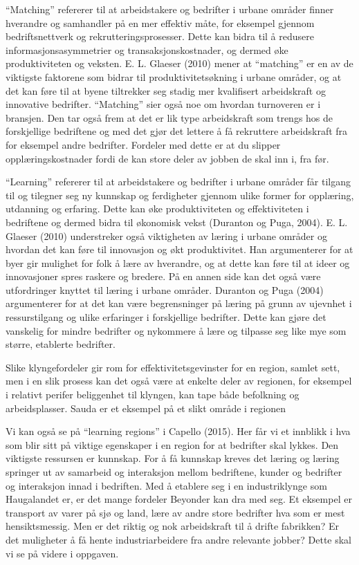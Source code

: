\documentclass[
]{article}
\begin{document}
``Matching'' refererer til at arbeidstakere og bedrifter i urbane
områder finner hverandre og samhandler på en mer effektiv måte, for
eksempel gjennom bedriftsnettverk og rekrutteringsprosesser. Dette kan
bidra til å redusere informasjonsasymmetrier og transaksjonskostnader,
og dermed øke produktiviteten og veksten. E. L. Glaeser (2010) mener at
``matching'' er en av de viktigste faktorene som bidrar til
produktivitetsøkning i urbane områder, og at det kan føre til at byene
tiltrekker seg stadig mer kvalifisert arbeidskraft og innovative
bedrifter. ``Matching'' sier også noe om hvordan turnoveren er i
bransjen. Den tar også frem at det er lik type arbeidskraft som trengs
hos de forskjellige bedriftene og med det gjør det lettere å få
rekruttere arbeidskraft fra for eksempel andre bedrifter. Fordeler med
dette er at du slipper opplæringskostnader fordi de kan store deler av
jobben de skal inn i, fra før.

``Learning'' refererer til at arbeidstakere og bedrifter i urbane
områder får tilgang til og tilegner seg ny kunnskap og ferdigheter
gjennom ulike former for opplæring, utdanning og erfaring. Dette kan øke
produktiviteten og effektiviteten i bedriftene og dermed bidra til
økonomisk vekst (Duranton og Puga, 2004). E. L. Glaeser (2010)
understreker også viktigheten av læring i urbane områder og hvordan det
kan føre til innovasjon og økt produktivitet. Han argumenterer for at
byer gir mulighet for folk å lære av hverandre, og at dette kan føre til
at ideer og innovasjoner spres raskere og bredere. På en annen side kan
det også være utfordringer knyttet til læring i urbane områder. Duranton
og Puga (2004) argumenterer for at det kan være begrensninger på læring
på grunn av ujevnhet i ressurstilgang og ulike erfaringer i forskjellige
bedrifter. Dette kan gjøre det vanskelig for mindre bedrifter og
nykommere å lære og tilpasse seg like mye som større, etablerte
bedrifter.

Slike klyngefordeler gir rom for effektivitetsgevinster for en region,
samlet sett, men i en slik prosess kan det også være at enkelte deler av
regionen, for eksempel i relativt perifer beliggenhet til klyngen, kan
tape både befolkning og arbeidsplasser. Sauda er et eksempel på et slikt
område i regionen

Vi kan også se på ``learning regions'' i Capello (2015). Her får vi et
innblikk i hva som blir sitt på viktige egenskaper i en region for at
bedrifter skal lykkes. Den viktigste ressursen er kunnskap. For å få
kunnskap kreves det læring og læring springer ut av samarbeid og
interaksjon mellom bedriftene, kunder og bedrifter og interaksjon innad
i bedriften. Med å etablere seg i en industriklynge som Haugalandet er,
er det mange fordeler Beyonder kan dra med seg. Et eksempel er transport
av varer på sjø og land, lære av andre store bedrifter hva som er mest
hensiktsmessig. Men er det riktig og nok arbeidskraft til å drifte
fabrikken? Er det muligheter å få hente industriarbeidere fra andre
relevante jobber? Dette skal vi se på videre i oppgaven.
\end{document}
